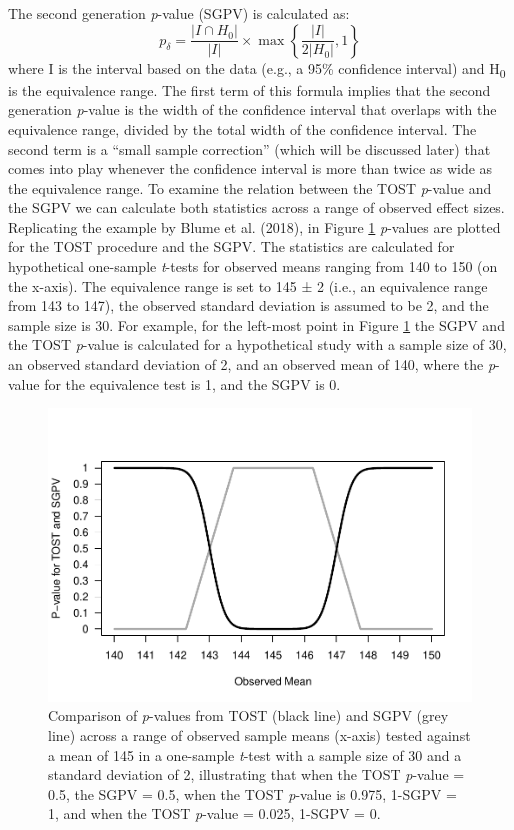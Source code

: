 \documentclass[,man,floatsintext]{apa6}
\begin{document}
The second generation \emph{p}-value (SGPV) is calculated as:
\[
  p _ { \delta } = \frac { \left| I \cap H _ { 0 } \right| } { | I | } \times \max \left\{ \frac { | I | } { 2 \left| H _ { 0 } \right| } , 1 \right\}
\]
where I is the interval based on the data (e.g., a 95\% confidence interval) and H\textsubscript{0} is the equivalence range. The first term of this formula implies that the second generation \emph{p}-value is the width of the confidence interval that overlaps with the equivalence range, divided by the total width of the confidence interval. The second term is a \enquote{small sample correction} (which will be discussed later) that comes into play whenever the confidence interval is more than twice as wide as the equivalence range.
To examine the relation between the TOST \emph{p}-value and the SGPV we can calculate both statistics across a range of observed effect sizes. Replicating the example by Blume et al. (2018), in Figure \ref{fig:TOSTSGPV1} \emph{p}-values are plotted for the TOST procedure and the SGPV. The statistics are calculated for hypothetical one-sample \emph{t}-tests for observed means ranging from 140 to 150 (on the x-axis). The equivalence range is set to 145 ± 2 (i.e., an equivalence range from 143 to 147), the observed standard deviation is assumed to be 2, and the sample size is 30. For example, for the left-most point in Figure \ref{fig:TOSTSGPV1} the SGPV and the TOST \emph{p}-value is calculated for a hypothetical study with a sample size of 30, an observed standard deviation of 2, and an observed mean of 140, where the \emph{p}-value for the equivalence test is 1, and the SGPV is 0.

\begin{figure}
\centering
\includegraphics{manuscript.R2_files/figure-latex/TOSTSGPV1-1.pdf}
\caption{\label{fig:TOSTSGPV1}Comparison of \emph{p}-values from TOST (black line) and SGPV (grey line) across a range of observed sample means (x-axis) tested against a mean of 145 in a one-sample \emph{t}-test with a sample size of 30 and a standard deviation of 2, illustrating that when the TOST \emph{p}-value = 0.5, the SGPV = 0.5, when the TOST \emph{p}-value is 0.975, 1-SGPV = 1, and when the TOST \emph{p}-value = 0.025, 1-SGPV = 0.}
\end{figure}
\end{document}

